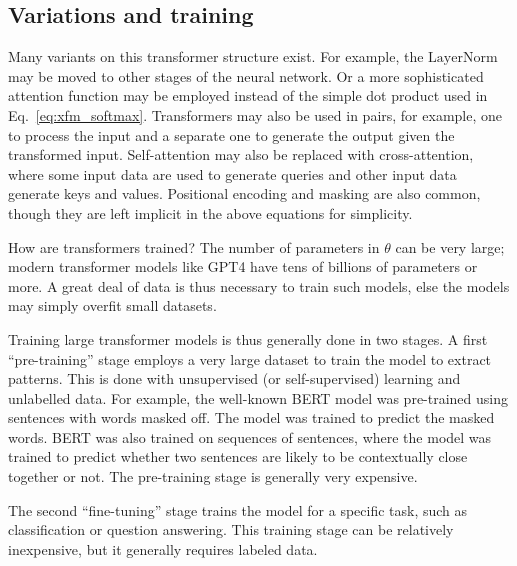 \subsection{Variations and training}

Many variants on this transformer structure exist.  For example, the $\text{LayerNorm}$ may be moved to other stages of the neural network.  Or a more sophisticated attention function may be employed instead of the simple dot product used in Eq.~\ref{eq:xfm_softmax}.  Transformers may also be used in pairs, for example, one to process the input and a separate one to generate the output given the transformed input.  Self-attention may also be replaced with cross-attention, where some input data are used to generate queries and other input data generate keys and values.  Positional encoding and masking are also common, though they are left implicit in the above equations for simplicity.

How are transformers trained?  The number of parameters in $\theta$ can be very large; modern transformer models like GPT4 have tens of billions of parameters or more.  A great deal of data is thus necessary to train such models, else the models may simply overfit small datasets.

Training large transformer models is thus generally done in two stages.  A first ``pre-training'' stage employs a very large dataset to train the model to extract patterns.  This is done with unsupervised (or self-supervised) learning and unlabelled data.  For example, the well-known BERT model was pre-trained using sentences with words masked off.  The model was trained to predict the masked words.  BERT was also trained on sequences of sentences, where the model was trained to predict whether two sentences are likely to be contextually close together or not.  The pre-training stage is generally very expensive.

The second ``fine-tuning'' stage trains the model for a specific task, such as classification or question answering.  This training stage can be relatively inexpensive, but it generally requires labeled data.

\fi


